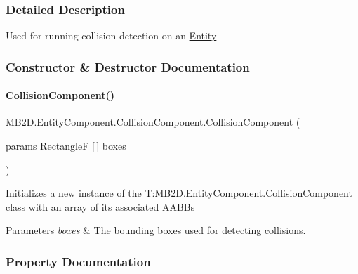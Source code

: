 \subsubsection{Detailed Description}
Used for running collision detection on an \hyperlink{class_m_b2_d_1_1_entity_component_1_1_entity}{Entity} 



\subsubsection{Constructor \& Destructor Documentation}
\hypertarget{class_m_b2_d_1_1_entity_component_1_1_collision_component_a6367fc81a9baf226bdd98cdc5814f5ac}{}\label{class_m_b2_d_1_1_entity_component_1_1_collision_component_a6367fc81a9baf226bdd98cdc5814f5ac} 
\paragraph{\texorpdfstring{Collision\+Component()}{CollisionComponent()}}
{\footnotesize\ttfamily M\+B2\+D.\+Entity\+Component.\+Collision\+Component.\+Collision\+Component (\begin{DoxyParamCaption}\item[{params RectangleF \mbox{[}$\,$\mbox{]}}]{boxes }\end{DoxyParamCaption})\hspace{0.3cm}{\ttfamily [inline]}}



Initializes a new instance of the T\+:\+M\+B2\+D.\+Entity\+Component.\+Collision\+Component class with an array of its associated A\+A\+BB\textquotesingle{}s 


\begin{DoxyParams}{Parameters}
{\em boxes} & The bounding boxes used for detecting collisions.\\
\hline
\end{DoxyParams}


\subsubsection{Property Documentation}
\hypertarget{class_m_b2_d_1_1_entity_component_1_1_collision_component_a1cc63c601df7e30ce5b63e50b487dc9e}{}\label{class_m_b2_d_1_1_entity_component_1_1_collision_component_a1cc63c601df7e30ce5b63e50b487dc9e} 
